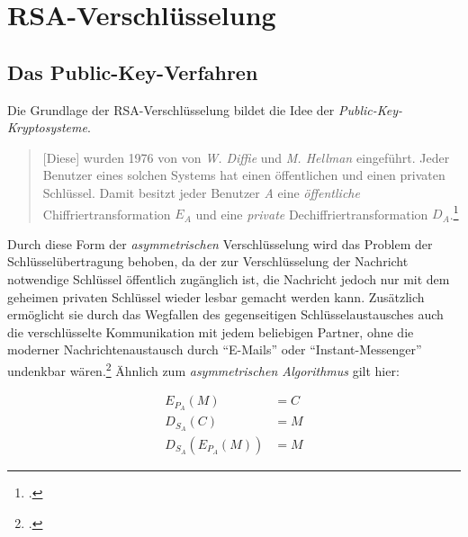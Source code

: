\documentclass{scrarticle} %
\begin{document}
        \section{RSA-Verschlüsselung}
        \subsection[Public-Key-Kryptosysteme]{Das Public-Key-Verfahren}
        Die Grundlage der RSA-Verschlüsselung bildet die Idee der \emph{Public-Key-Kryptosysteme}.

        \begin{quote}
            [Diese] wurden 1976 von von \emph{W. Diffie} und \emph{M. Hellman} eingeführt. Jeder Benutzer eines solchen Systems hat einen öffentlichen und einen privaten Schlüssel. Damit besitzt jeder Benutzer \emph{A} eine \emph{öffentliche} Chiffriertransformation $E_A$ und eine \emph{private} Dechiffriertransformation $D_A$.\footcite[67]{watjen2008}
        \end{quote} %
        Durch diese Form der \emph{asymmetrischen} Verschlüsselung wird das Problem der Schlüsselübertragung behoben, da der zur Verschlüsselung der Nachricht notwendige Schlüssel öffentlich zugänglich ist, die Nachricht jedoch nur mit dem geheimen privaten Schlüssel wieder lesbar gemacht werden kann. Zusätzlich ermöglicht sie durch das Wegfallen des gegenseitigen Schlüsselaustausches auch die verschlüsselte Kommunikation mit jedem beliebigen Partner, ohne die moderner Nachrichtenaustausch durch \enquote{E-Mails} oder \enquote{Instant-Messenger} undenkbar wären.\footcite[Vgl.][21]{ertel2003} Ähnlich zum \emph{asymmetrischen Algorithmus} gilt hier:

        \begin{align}
            E_{P_A}(M) &= C \\
            D_{S_A}(C) &= M \\
            D_{S_A}\left(E_{P_A}(M)\right) &= M
        \end{align}
\end{document}
